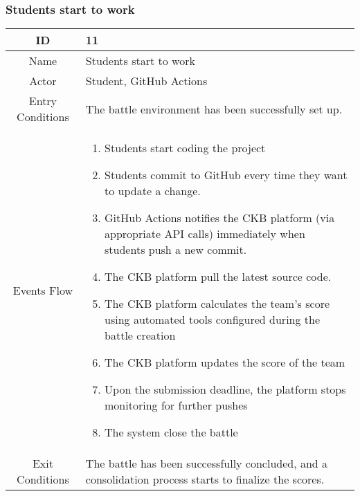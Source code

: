 \newpage
\subsubsection{Students start to work}
\begin{longtable}{|c| p{10cm}|}
        \hline
            ID & 11 \\
        \hline
            Name & Students start to work \\
        \hline
            Actor & Student, GitHub Actions\\
        \hline
            Entry Conditions & 
              The battle environment has been successfully set up.
            
                     
        
         \\
        \hline
            Events Flow &   \begin{enumerate}
                              \item Students start coding the project 
                              \item Students commit to GitHub every time they want to update a change.
                                \item GitHub Actions notifies the CKB platform (via appropriate API calls) immediately when students push a new commit.
                                \item The CKB platform  pull the latest source code.
                                \item  The CKB platform calculates the team's score using automated tools configured during the battle creation
                                \item  The CKB platform updates the score of the team
                                \item Upon the submission deadline, the  platform stops monitoring for further pushes
                                \item The system close  the battle 
                            \end{enumerate} \\
                            \hline
            Exit Conditions &
    
                               The battle has been successfully concluded, and a consolidation process starts to finalize the scores.
                                \\
        \hline
            
    \end{longtable}


